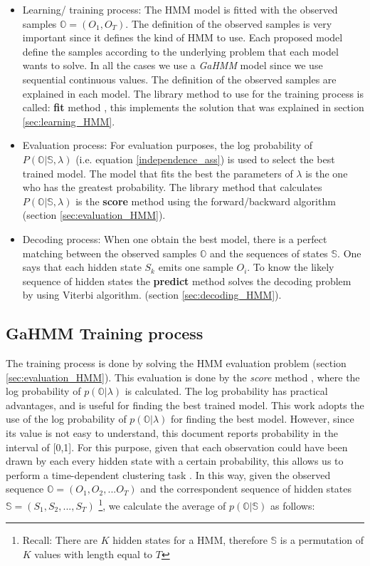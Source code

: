\begin{itemize}
\item Learning/ training process: The HMM model is fitted with the observed samples $\mathbb{O} = (O_1, O_T)$. The definition of the observed samples is very important since it defines the kind of HMM to use. Each proposed model define the samples according to the underlying problem that each model wants to solve. In all the cases we use a \textit{GaHMM} model since we use sequential continuous values. The definition of the observed samples are explained in each model. The library method to use for the training process is called: \textbf{fit} method \cite{gahmm_manual}, this implements the solution that was explained in section \ref{sec:learning_HMM}.
\item Evaluation process: For evaluation purposes, the log probability of $P(\mathbb{O} |\mathbb{S}, \lambda)$ (i.e. equation \ref{independence_ass}) is used to select the best trained model. The model that fits the best the parameters of $\lambda$ is the one who has the greatest probability. The library method that calculates $P(\mathbb{O} |\mathbb{S}, \lambda)$ is the \textbf{score} method using the forward/backward algorithm (section \ref{sec:evaluation_HMM}).    
\item Decoding process: When one obtain the best model, there is a perfect matching between the observed samples $\mathbb{O}$ and the sequences of states $\mathbb{S}$. One says that each hidden state $S_k$ emits one sample $O_i$. To know the likely sequence of hidden states the \textbf{predict} method solves the decoding problem by using Viterbi algorithm. (section \ref{sec:decoding_HMM}).  
\end{itemize}

\subsection{GaHMM Training process}
\label{sec:training_process}
 
The training process is done by solving the HMM evaluation problem (section \ref{sec:evaluation_HMM}). This evaluation is done by the \textit{score} method \cite{gahmm_manual}, where the log probability of $p(\mathbb{O}|\lambda)$ is calculated. The log probability has practical advantages, and is useful for finding the best trained model. This work adopts the use of the log probability of $p(\mathbb{O}|\lambda)$ for finding the best model. However, since its value is not easy to understand, this document reports probability in the interval of [0,1]. For this purpose, given that each observation could have been drawn by each every hidden state with a certain probability, this allows us to perform a time-dependent clustering task \citep{pfundstein2011hidden}. In this way, given the observed sequence $\mathbb{O} = (O_1, O_2,... O_T)$ and the correspondent sequence of hidden states $\mathbb{S} = (S_1, S_2,..., S_T)$ \footnote{Recall: There are $K$ hidden states for a HMM, therefore $\mathbb{S}$ is a permutation of $K$ values with length equal to $T$}, we calculate the average of $p(\mathbb{O}|\mathbb{S})$ as follows:

